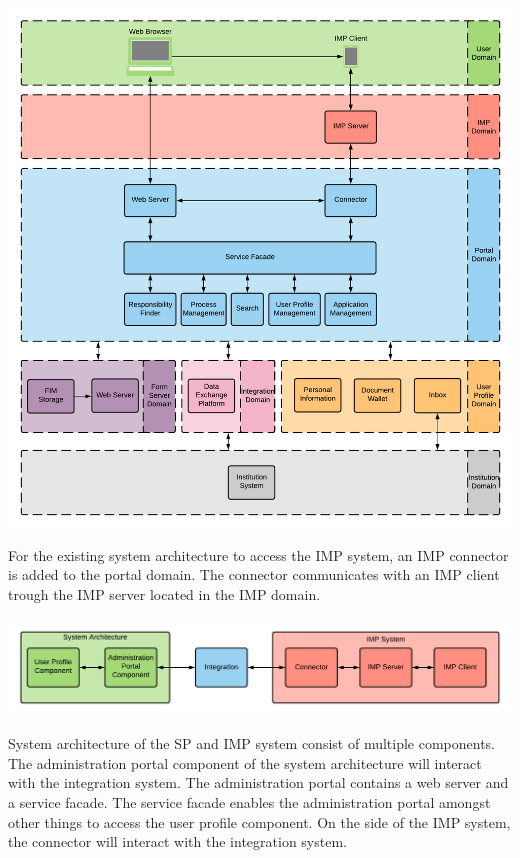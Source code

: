 \begin{center}
    \includegraphics[scale=0.6]{Diagrams/Integration Architecture 1/Overview.pdf}
\end{center}

For the existing system architecture to access the IMP system, an IMP connector is added to the portal domain. The connector communicates with an IMP client trough the IMP server located in the IMP domain.

\begin{center}
    \includegraphics[scale=0.6]{Diagrams/Integration Architecture 1/Technological Integration/2. System Overview.pdf}
\end{center}

System architecture of the SP and IMP system consist of multiple components. The administration portal component of the system architecture  will interact with the integration system. The administration portal contains a web server and a service facade. The service facade enables the administration portal amongst other things to access the user profile component. On the side of the IMP system, the connector will interact with the integration system.

